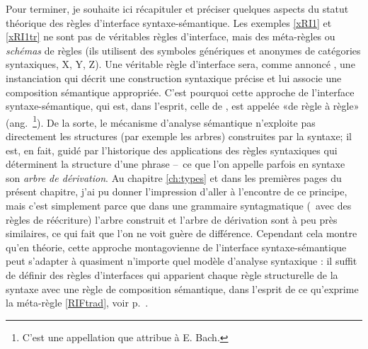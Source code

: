 Pour terminer, je souhaite ici récapituler et préciser quelques aspects du statut théorique des règles d'interface syntaxe-sémantique. 
Les exemples \ref{xRI1} et \ref{xRI1tr} ne sont pas de véritables règles d'interface, mais des méta-règles ou \emph{schémas} de règles (ils utilisent des symboles génériques et anonymes de catégories syntaxiques, X, Y, Z). 
Une véritable règle d'interface sera, comme annoncé , une instanciation qui décrit une construction syntaxique précise et lui associe une composition sémantique appropriée.  C'est pourquoi cette approche de l'interface syntaxe-sémantique, qui est, dans l'esprit, celle de \citet{Montague:UG,PTQ}, est appelée «de règle à règle» (ang.\ \footnote{C'est une appellation que \citet{Partee:96} attribue à E. Bach.}).
De la sorte, le mécanisme d'analyse sémantique n'exploite pas directement les structures (par exemple les arbres) construites par la syntaxe; il est, en fait, guidé par l'historique des applications des règles syntaxiques qui déterminent  la structure d'une phrase --~ce que l'on appelle parfois en syntaxe son \emph{arbre de dérivation}.  
Au chapitre \ref{ch:types} et dans les premières pages du présent chapitre, j'ai pu donner l'impression d'aller à l'encontre de ce principe,
mais c'est simplement parce que dans une grammaire syntagmatique (\ie\ avec des règles de réécriture) l'arbre construit et l'arbre de dérivation sont à peu près similaires, ce qui fait que l'on ne voit guère de différence. 
Cependant cela montre qu'en théorie, cette approche montagovienne de l'interface syntaxe-sémantique peut s'adapter à quasiment n'importe quel modèle d'analyse syntaxique : il suffit de définir des règles d'interfaces qui apparient chaque règle structurelle de la syntaxe avec une règle de composition sémantique,  dans l'esprit de ce qu'exprime la méta-règle \ref{RIFtrad}, voir p.~\pageref{RIFtrad}.

\newcommand{\relstruc}[1]{\ensuremath{R_{#1}}}

